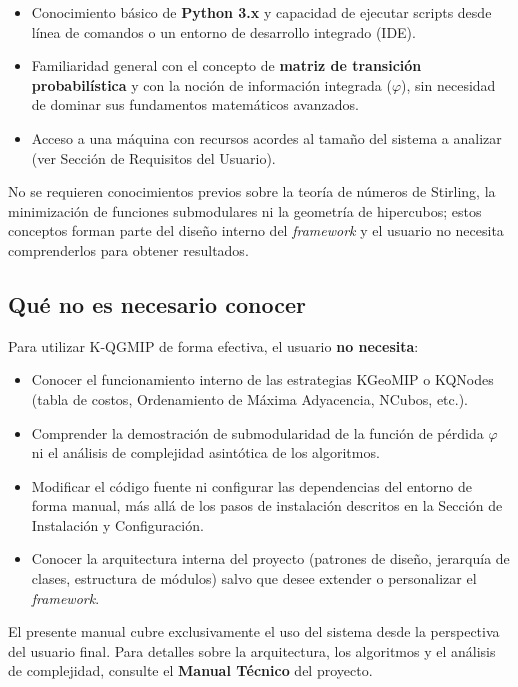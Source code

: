 \begin{itemize}
  \item Conocimiento básico de \textbf{Python 3.x} y capacidad de ejecutar scripts desde
        línea de comandos o un entorno de desarrollo integrado (IDE).
  \item Familiaridad general con el concepto de \textbf{matriz de transición probabilística}
        y con la noción de información integrada ($\varphi$), sin necesidad de dominar sus
        fundamentos matemáticos avanzados.
  \item Acceso a una máquina con recursos acordes al tamaño del sistema a analizar
        (ver Sección de Requisitos del Usuario).
\end{itemize}

No se requieren conocimientos previos sobre la teoría de números de Stirling, la
minimización de funciones submodulares ni la geometría de hipercubos; estos conceptos
forman parte del diseño interno del \textit{framework} y el usuario no necesita comprenderlos
para obtener resultados.

\subsection*{Qué no es necesario conocer}

Para utilizar K-QGMIP de forma efectiva, el usuario \textbf{no necesita}:

\begin{itemize}
  \item Conocer el funcionamiento interno de las estrategias KGeoMIP o KQNodes
        (tabla de costos, Ordenamiento de Máxima Adyacencia, NCubos, etc.).
  \item Comprender la demostración de submodularidad de la función de pérdida $\varphi$
        ni el análisis de complejidad asintótica de los algoritmos.
  \item Modificar el código fuente ni configurar las dependencias del entorno de forma manual,
        más allá de los pasos de instalación descritos en la Sección de Instalación y Configuración.
  \item Conocer la arquitectura interna del proyecto (patrones de diseño, jerarquía de clases,
        estructura de módulos) salvo que desee extender o personalizar el \textit{framework}.
\end{itemize}

El presente manual cubre exclusivamente el uso del sistema desde la perspectiva del usuario
final. Para detalles sobre la arquitectura, los algoritmos y el análisis de complejidad,
consulte el \textbf{Manual Técnico} del proyecto.
